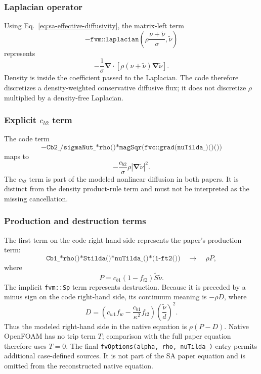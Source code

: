 \documentclass[11pt]{article}
\newcommand{\SAgrad}{\boldsymbol{\nabla}}
\newcommand{\SAdiv}{\boldsymbol{\nabla}\!\cdot}
\newcommand{\SAcode}[1]{\texttt{#1}}
\newcommand{\SAOF}{OpenFOAM}
\begin{document}
\subsubsection{Laplacian operator}

Using Eq.~\eqref{eq:sa-effective-diffusivity}, the matrix-left term
\begin{equation*}
  -\SAcode{fvm::laplacian}
  \left(
    \rho\frac{\nu+\widetilde{\nu}}{\sigma},
    \widetilde{\nu}
  \right)
\end{equation*}
represents
\begin{equation}
  -\frac{1}{\sigma}
  \SAdiv\!\left[
    \rho(\nu+\widetilde{\nu})\SAgrad\widetilde{\nu}
  \right].
  \label{eq:sa-native-laplacian}
\end{equation}
Density is inside the coefficient passed to the Laplacian.  The code therefore
discretizes a density-weighted conservative diffusive flux; it does not
discretize \(\rho\) multiplied by a density-free Laplacian.

\subsubsection{Explicit \texorpdfstring{\(c_{b2}\)}{cb2} term}

The code term
\[
  -\SAcode{Cb2\_/sigmaNut\_*rho()*magSqr(fvc::grad(nuTilda\_)()())}
\]
maps to
\begin{equation}
  -\frac{c_{b2}}{\sigma}\rho
  \left|\SAgrad\widetilde{\nu}\right|^2.
  \label{eq:sa-native-cb2}
\end{equation}
The \(c_{b2}\) term is part of the modeled nonlinear diffusion in both
papers.  It is distinct from the density product-rule term and must not be
interpreted as the missing cancellation.

\subsubsection{Production and destruction terms}

The first term on the code right-hand side represents the paper's production
term:
\[
  \SAcode{Cb1\_*rho()*Stilda()*nuTilda\_()*(1-ft2())}
  \quad\longrightarrow\quad
  \rho P,
\]
where
\begin{equation}
  P=c_{b1}(1-f_{t2})\widetilde S\widetilde{\nu}.
  \label{eq:sa-native-production}
\end{equation}
The implicit \SAcode{fvm::Sp} term represents destruction.  Because it is
preceded by a minus sign on the code right-hand side, its continuum meaning is
\(-\rho D\), where
\begin{equation}
  D=
  \left(
    c_{w1}f_w-\frac{c_{b1}}{\kappa^2}f_{t2}
  \right)
  \left(\frac{\widetilde{\nu}}{d}\right)^2.
  \label{eq:sa-native-destruction}
\end{equation}
Thus the modeled right-hand side in the native equation is \(\rho(P-D)\).
Native \SAOF{} has no trip term \(T\); comparison with the full paper equation
therefore uses \(T=0\).  The final
\SAcode{fvOptions(alpha, rho, nuTilda\_)} entry permits additional case-defined
sources.  It is not part of the SA paper equation and is omitted from the
reconstructed native equation.
\end{document}
